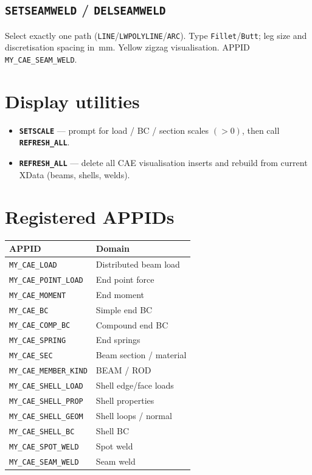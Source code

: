 \documentclass[a4paper]{ltxdoc}
\newcommand{\cadcmd}[1]{\texttt{\textbf{#1}}}
\newcommand{\appid}[1]{\texttt{#1}}
\begin{document}
\subsection{\cadcmd{SETSEAMWELD} / \cadcmd{DELSEAMWELD}}
Select exactly one path (\texttt{LINE}/\texttt{LWPOLYLINE}/\texttt{ARC}).
Type \texttt{Fillet}/\texttt{Butt}; leg size and discretisation spacing
in~mm.  Yellow zigzag visualisation.
APPID \appid{MY\_CAE\_SEAM\_WELD}.

\section{Display utilities}

\begin{itemize}[nosep]
  \item \cadcmd{SETSCALE} --- prompt for load / BC / section scales $(>0)$,
        then call \cadcmd{REFRESH\_ALL}.
  \item \cadcmd{REFRESH\_ALL} --- delete all CAE visualisation inserts and
        rebuild from current XData (beams, shells, welds).
\end{itemize}

\section{Registered APPIDs}

\begin{center}
\begin{tabular}{@{}ll@{}}
\toprule
APPID & Domain \\
\midrule
\appid{MY\_CAE\_LOAD}         & Distributed beam load \\
\appid{MY\_CAE\_POINT\_LOAD}  & End point force \\
\appid{MY\_CAE\_MOMENT}       & End moment \\
\appid{MY\_CAE\_BC}           & Simple end BC \\
\appid{MY\_CAE\_COMP\_BC}     & Compound end BC \\
\appid{MY\_CAE\_SPRING}       & End springs \\
\appid{MY\_CAE\_SEC}          & Beam section / material \\
\appid{MY\_CAE\_MEMBER\_KIND} & BEAM / ROD \\
\appid{MY\_CAE\_SHELL\_LOAD}  & Shell edge/face loads \\
\appid{MY\_CAE\_SHELL\_PROP}  & Shell properties \\
\appid{MY\_CAE\_SHELL\_GEOM}  & Shell loops / normal \\
\appid{MY\_CAE\_SHELL\_BC}    & Shell BC \\
\appid{MY\_CAE\_SPOT\_WELD}   & Spot weld \\
\appid{MY\_CAE\_SEAM\_WELD}   & Seam weld \\
\bottomrule
\end{tabular}
\end{center}
\end{document}
